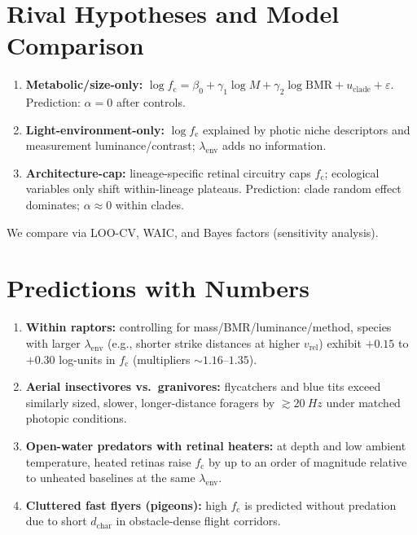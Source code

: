 \documentclass[11pt]{article}
\newcommand{\fc}{f_{\mathrm{c}}}             %
\newcommand{\vrel}{v_{\mathrm{rel}}}          %
\newcommand{\dchar}{d_{\mathrm{char}}}        %
\newcommand{\lamenv}{\lambda_{\mathrm{env}}}  %
\begin{document}
\section{Rival Hypotheses and Model Comparison}
\begin{enumerate}[leftmargin=1.5em]
\item \textbf{Metabolic/size-only:} $\log\fc = \beta_0 + \gamma_1 \log M + \gamma_2 \log \mathrm{BMR} + u_{\text{clade}} + \varepsilon$. Prediction: $\alpha=0$ after controls. \citep{Healy2013}
\item \textbf{Light-environment-only:} $\log\fc$ explained by photic niche descriptors and measurement luminance/contrast; $\lamenv$ adds no information.
\item \textbf{Architecture-cap:} lineage-specific retinal circuitry caps $\fc$; ecological variables only shift within-lineage plateaus. Prediction: clade random effect dominates; $\alpha \approx 0$ within clades.
\end{enumerate}
We compare via LOO-CV, WAIC, and Bayes factors (sensitivity analysis).

\section{Predictions with Numbers}
\begin{enumerate}[leftmargin=1.5em]
\item \textbf{Within raptors:} controlling for mass/BMR/luminance/method, species with larger $\lamenv$ (e.g., shorter strike distances at higher $\vrel$) exhibit $+0.15$ to $+0.30$ log-units in $\fc$ (multipliers $\sim1.16$--$1.35$). \citep{Potier2020}
\item \textbf{Aerial insectivores vs.\ granivores:} flycatchers and blue tits exceed similarly sized, slower, longer-distance foragers by $\gtrsim\SI{20}{Hz}$ under matched photopic conditions. \citep{Bostrom2016}
\item \textbf{Open-water predators with retinal heaters:} at depth and low ambient temperature, heated retinas raise $\fc$ by up to an order of magnitude relative to unheated baselines at the same $\lamenv$. \citep{SwordfishHeaters}
\item \textbf{Cluttered fast flyers (pigeons):} high $\fc$ is predicted without predation due to short $\dchar$ in obstacle-dense flight corridors. \citep{PigeonERG}
\end{enumerate}
\end{document}
